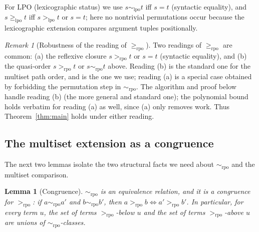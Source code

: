 \documentclass{amsart}
\newtheorem{lemma}{Lemma}
\theoremstyle{definition}
\theoremstyle{remark}
\newtheorem{remark}{Remark}
\newcommand{\rpo}{>_{\mathrm{rpo}}}
\newcommand{\rpoe}{\ge_{\mathrm{rpo}}}
\newcommand{\lpo}{>_{\mathrm{lpo}}}
\newcommand{\lpoe}{\ge_{\mathrm{lpo}}}
\begin{document}
For LPO (lexicographic status) we use $s\sim_{\mathrm{lpo}}t$ iff $s=t$
(syntactic equality), and $s\lpoe t$ iff $s\lpo t$ or $s=t$; here no nontrivial
permutations occur because the lexicographic extension compares argument tuples
positionally.

\begin{remark}[Robustness of the reading of $\rpoe$]\label{rem:reading}
Two readings of $\rpoe$ are common: (a) the reflexive closure
$s\rpo t \text{ or } s=t$ (syntactic equality), and (b) the quasi-order
$s\rpo t \text{ or } s\sim_{\mathrm{rpo}}t$ above. Reading (b) is the standard
one for the multiset path order, and is the one we use; reading (a) is a special
case obtained by forbidding the permutation step in $\sim_{\mathrm{rpo}}$. The
algorithm and proof below handle reading (b) (the more general and standard
one); the polynomial bound holds verbatim for reading (a) as well, since (a)
only removes work. Thus Theorem~\ref{thm:main} holds under either reading.
\end{remark}

\subsection{The multiset extension as a congruence}
The next two lemmas isolate the two structural facts we need about
$\sim_{\mathrm{rpo}}$ and the multiset comparison.

\begin{lemma}[Congruence]\label{lem:cong}
$\sim_{\mathrm{rpo}}$ is an equivalence relation, and it is a congruence for
$\rpo$: if $a\sim_{\mathrm{rpo}}a'$ and $b\sim_{\mathrm{rpo}}b'$, then
$a\rpo b\iff a'\rpo b'$. In particular, for every term $u$, the set of terms
$\rpo$-below $u$ and the set of terms $\rpo$-above $u$ are unions of
$\sim_{\mathrm{rpo}}$-classes.
\end{lemma}
\end{document}
